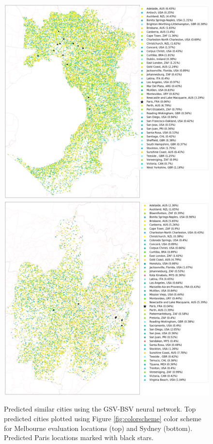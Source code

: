 \documentclass[sageh,times]{sagej}
\begin{document}
\begin{figure}[!htbp]
\centering    
\includegraphics[scale=0.16]{Images/MelbourneOverallAbrev_street.png} 
\includegraphics[scale=0.16]{Images/SydneyOverallAbrev_street.png}  
\caption{Predicted similar cities using the GSV-BSV neural network. Top predicted cities plotted using Figure \ref{fig:colorscheme} color scheme for Melbourne evaluation locations (top) and Sydney (bottom). Predicted Paris locations marked with black stars.}   
 \label{fig:melstreet}  
\end{figure} 
\end{document}
